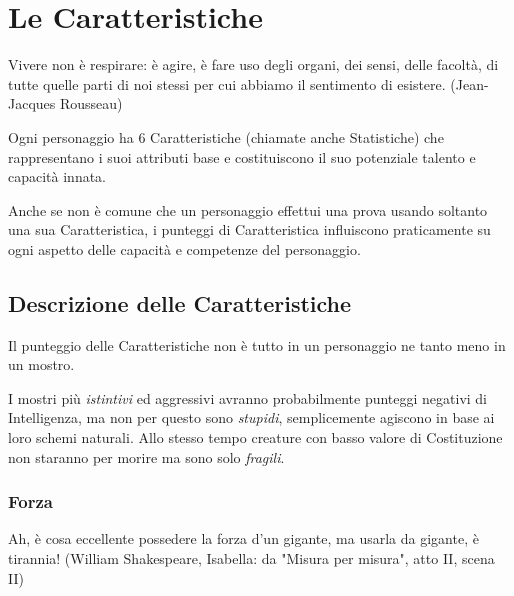 \section{Le Caratteristiche}

\begin{changemargin}{0.3cm}{0.3cm}\begin{enfasi}{
Vivere non è respirare: è agire, è fare uso degli organi, dei sensi, delle facoltà, di tutte quelle parti di noi stessi per cui abbiamo il sentimento di esistere. (Jean-Jacques Rousseau)
}\end{enfasi}\end{changemargin}\medskip

\begin{multicols}{2}

Ogni personaggio ha 6 Caratteristiche (chiamate anche Statistiche) che rappresentano i suoi attributi base e costituiscono il suo potenziale talento e capacità innata.

Anche se non è comune che un personaggio effettui una prova usando soltanto una sua Caratteristica, i punteggi di Caratteristica influiscono praticamente su ogni aspetto delle capacità e competenze del personaggio.

\subsection{Descrizione delle Caratteristiche}\label{decrizionedellecaratteristiche}

Il punteggio delle Caratteristiche non è tutto in un personaggio ne tanto meno in un mostro.

I mostri più \emph{istintivi} ed aggressivi avranno probabilmente punteggi negativi di Intelligenza, ma non per questo sono \emph{stupidi}, semplicemente agiscono in base ai loro schemi naturali. Allo stesso tempo creature con basso valore di Costituzione non staranno per morire ma sono solo \emph{fragili}.

\subsubsection{Forza}\label{forza}

\begin{changemargin}{0.3cm}{0.3cm}\begin{enfasi}{
Ah, è cosa eccellente possedere la forza d'un gigante, ma usarla da gigante, è tirannia! (William Shakespeare, Isabella: da "Misura per misura", atto II, scena II)
}\end{enfasi}\end{changemargin}


\end{multicols}
